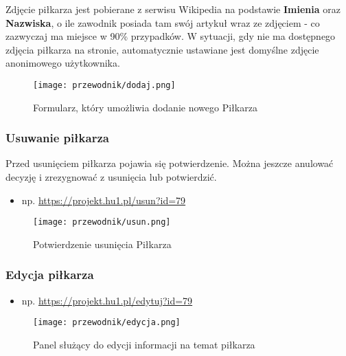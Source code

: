         
                 Zdjęcie piłkarza jest pobierane z serwisu Wikipedia na podstawie \textbf{Imienia} oraz \textbf{Nazwiska}, o ile zawodnik posiada tam swój artykuł wraz ze zdjęciem - co zazwyczaj ma miejsce w 90\% przypadków. W sytuacji, gdy nie ma dostępnego zdjęcia piłkarza na stronie, automatycznie ustawiane jest domyślne zdjęcie anonimowego użytkownika.

                    \begin{figure}[!htb]
                        \centering
                        \texttt{[image: przewodnik/dodaj.png]}
                        \caption{Formularz, który umożliwia dodanie nowego Piłkarza}                
                    \end{figure}
                    \pagebreak

        \subsubsection{Usuwanie piłkarza}
        Przed usunięciem piłkarza pojawia się potwierdzenie. Można jeszcze anulować decyzję i zrezygnować z usunięcia lub potwierdzić.
            \begin{itemize}
                \item np. \url{https://projekt.hu1.pl/usun?id=79}
            \end{itemize}
            
            \begin{figure}[!htb]
                \centering
                \texttt{[image: przewodnik/usun.png]}
                \caption{Potwierdzenie usunięcia Piłkarza}                
            \end{figure}
            \pagebreak

        \subsubsection{Edycja piłkarza}

            \begin{itemize}
                \item np. \url{https://projekt.hu1.pl/edytuj?id=79}
            \end{itemize}
            

            \begin{figure}[!htb]
                \centering
                \texttt{[image: przewodnik/edycja.png]}
                \caption{Panel służący do edycji informacji na temat piłkarza}                
            \end{figure}

